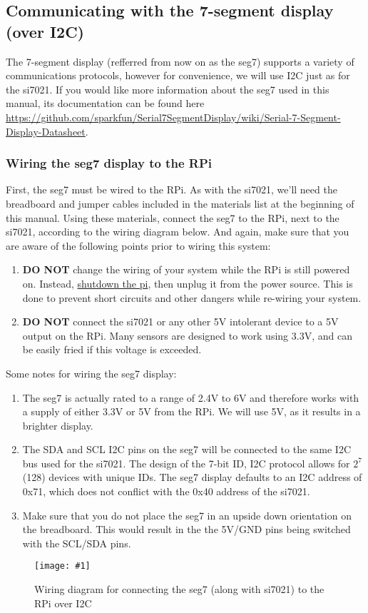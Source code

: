 \documentclass{article}
\newcommand{\imagefigb}[2]{
    \begin{figure}[H]
        \centering
        \texttt{[image: \#1]}
        \caption{#2}
    \end{figure}
}
\begin{document}
  \subsection{Communicating with the 7-segment display (over I2C)}
  The 7-segment display (refferred from now on as the seg7) supports a variety of communications protocols, however for convenience, we will use I2C just as for the si7021. If you would like more information about the seg7 used in this manual, its documentation can be found here \newline\href{https://github.com/sparkfun/Serial7SegmentDisplay/wiki/Serial-7-Segment-Display-Datasheet}{https://github.com/sparkfun/Serial7SegmentDisplay/wiki/Serial-7-Segment-Display-Datasheet}.
    \subsubsection{Wiring the seg7 display to the RPi}
    First, the seg7 must be wired to the RPi. As with the si7021, we'll need the breadboard and jumper cables included in the materials list at the beginning of this manual. Using these materials, connect the seg7 to the RPi, next to the si7021, according to the wiring diagram below. And again, make sure that you are aware of the following points prior to wiring this system:
    \begin{enumerate}
      \item \textbf{DO NOT} change the wiring of your system while the RPi is still powered on. Instead, \hyperref[sec:shutting-down]{shutdown the pi}, then unplug it from the power source. This is done to prevent short circuits and other dangers while re-wiring your system.
      \item \textbf{DO NOT} connect the si7021 or any other 5V intolerant device to a 5V output on the RPi. Many sensors are designed to work using 3.3V, and can be easily fried if this voltage is exceeded.
    \end{enumerate}
    Some notes for wiring the seg7 display:
    \begin{enumerate}
      \item The seg7 is actually rated to a range of 2.4V to 6V and therefore works with a supply of either 3.3V or 5V from the RPi. We will use 5V, as it results in a brighter display.
      \item The SDA and SCL I2C pins on the seg7 will be connected to the same I2C bus used for the si7021. The design of the 7-bit ID, I2C protocol allows for $2^7$ (128) devices with unique IDs. The seg7 display defaults to an I2C address of 0x71, which does not conflict with the 0x40 address of the si7021.
      \item Make sure that you do not place the seg7 in an upside down orientation on the breadboard. This would result in the the 5V/GND pins being switched with the SCL/SDA pins.
    \end{enumerate}
    \newline
    \noindent
    \imagefigb{si7021-seg7-wiring-diagram.png}{Wiring diagram for connecting the seg7 (along with si7021) to the RPi over I2C}
\end{document}
